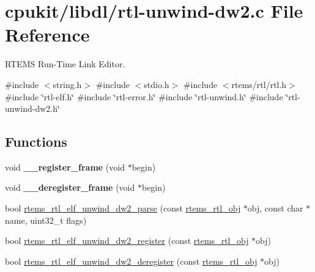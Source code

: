 \hypertarget{rtl-unwind-dw2_8c}{}\section{cpukit/libdl/rtl-\/unwind-\/dw2.c File Reference}
\label{rtl-unwind-dw2_8c}


R\+T\+E\+MS Run-\/\+Time Link Editor.  


{\ttfamily \#include $<$string.\+h$>$}\newline
{\ttfamily \#include $<$stdio.\+h$>$}\newline
{\ttfamily \#include $<$rtems/rtl/rtl.\+h$>$}\newline
{\ttfamily \#include \char`\"{}rtl-\/elf.\+h\char`\"{}}\newline
{\ttfamily \#include \char`\"{}rtl-\/error.\+h\char`\"{}}\newline
{\ttfamily \#include \char`\"{}rtl-\/unwind.\+h\char`\"{}}\newline
{\ttfamily \#include \char`\"{}rtl-\/unwind-\/dw2.\+h\char`\"{}}\newline
\subsection*{Functions}
\begin{DoxyCompactItemize}
\item 
\mbox{\label{rtl-unwind-dw2_8c_ae5b67e44d91284ac29c276fddb918321}} 
void {\bfseries \+\_\+\+\_\+register\+\_\+frame} (void $\ast$begin)
\item 
\mbox{\label{rtl-unwind-dw2_8c_a239f4592cea98ca80e9b64f11ff77056}} 
void {\bfseries \+\_\+\+\_\+deregister\+\_\+frame} (void $\ast$begin)
\item 
bool \mbox{\hyperlink{rtl-unwind-dw2_8c_a0c7193498e6ee5edea31888a8a904950}{rtems\+\_\+rtl\+\_\+elf\+\_\+unwind\+\_\+dw2\+\_\+parse}} (const \mbox{\hyperlink{structrtems__rtl__obj}{rtems\+\_\+rtl\+\_\+obj}} $\ast$obj, const char $\ast$name, uint32\+\_\+t flags)
\item 
bool \mbox{\hyperlink{rtl-unwind-dw2_8c_ab36b84a3de9ae023f5e7badf05d9b893}{rtems\+\_\+rtl\+\_\+elf\+\_\+unwind\+\_\+dw2\+\_\+register}} (const \mbox{\hyperlink{structrtems__rtl__obj}{rtems\+\_\+rtl\+\_\+obj}} $\ast$obj)
\item 
bool \mbox{\hyperlink{rtl-unwind-dw2_8c_a1aceba6bf892b99109243a17fb714f7f}{rtems\+\_\+rtl\+\_\+elf\+\_\+unwind\+\_\+dw2\+\_\+deregister}} (const \mbox{\hyperlink{structrtems__rtl__obj}{rtems\+\_\+rtl\+\_\+obj}} $\ast$obj)
\end{DoxyCompactItemize}


